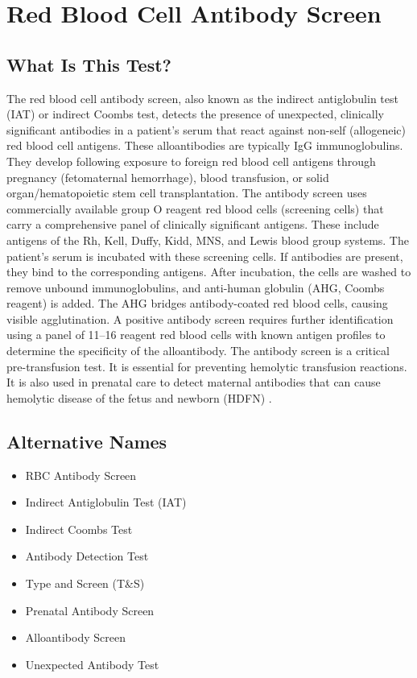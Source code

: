 \chapter{Red Blood Cell Antibody Screen}

\section*{What Is This Test?}
The red blood cell antibody screen, also known as the indirect antiglobulin test (IAT) or indirect Coombs test, detects the presence of unexpected, clinically significant antibodies in a patient's serum that react against non-self (allogeneic) red blood cell antigens. These alloantibodies are typically IgG immunoglobulins. They develop following exposure to foreign red blood cell antigens through pregnancy (fetomaternal hemorrhage), blood transfusion, or solid organ/hematopoietic stem cell transplantation. The antibody screen uses commercially available group O reagent red blood cells (screening cells) that carry a comprehensive panel of clinically significant antigens. These include antigens of the Rh, Kell, Duffy, Kidd, MNS, and Lewis blood group systems. The patient's serum is incubated with these screening cells. If antibodies are present, they bind to the corresponding antigens. After incubation, the cells are washed to remove unbound immunoglobulins, and anti-human globulin (AHG, Coombs reagent) is added. The AHG bridges antibody-coated red blood cells, causing visible agglutination. A positive antibody screen requires further identification using a panel of 11--16 reagent red blood cells with known antigen profiles to determine the specificity of the alloantibody. The antibody screen is a critical pre-transfusion test. It is essential for preventing hemolytic transfusion reactions. It is also used in prenatal care to detect maternal antibodies that can cause hemolytic disease of the fetus and newborn (HDFN) \cite{tierney2023current}.

\section*{Alternative Names}
\begin{itemize}
  \item RBC Antibody Screen
  \item Indirect Antiglobulin Test (IAT)
  \item Indirect Coombs Test
  \item Antibody Detection Test
  \item Type and Screen (T\&S)
  \item Prenatal Antibody Screen
  \item Alloantibody Screen
  \item Unexpected Antibody Test
\end{itemize}
